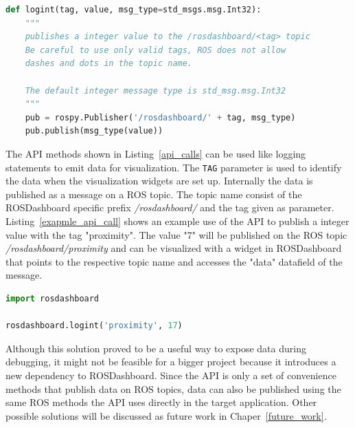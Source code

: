 \begin{lstlisting}[float,frame=single,caption={Implemented logint API method.},label=api_implementation,language=Python]
def logint(tag, value, msg_type=std_msgs.msg.Int32):
    """
    publishes a integer value to the /rosdashboard/<tag> topic
    Be careful to use only valid tags, ROS does not allow
    dashes and dots in the topic name.
    
    The default integer message type is std_msg.msg.Int32
    """
    pub = rospy.Publisher('/rosdashboard/' + tag, msg_type)
    pub.publish(msg_type(value))
\end{lstlisting}

The API methods shown in Listing~\ref{api_calls} can be used like logging statements to emit data for visualization. The \verb+TAG+ parameter is used to identify the data when the visualization widgets are set up. Internally the data is published as a message on a ROS topic. The topic name consist of the ROSDashboard specific prefix \emph{/rosdashboard/} and the tag given as parameter. Listing~\ref{exapmle_api_call} shows an example use of the API to publish a integer value with the tag "proximity". The value "7" will be published on the ROS topic \emph{/rosdashboard/proximity} and can be visualized with a widget in ROSDashboard that points to the respective topic name and accesses the "data" datafield of the message.

\begin{lstlisting}[float,frame=single,caption={Example API usage.},label=example_api_call,language=Python]
import rosdashboard

rosdashboard.logint('proximity', 17)
\end{lstlisting}

Although this solution proved to be a useful way to expose data during debugging, it might not be feasible for a bigger project because it introduces a new dependency to ROSDashboard. Since the API is only a set of convenience methods that publish data on ROS topics, data can also be published using the same ROS methods the API uses directly in the target application. Other possible solutions will be discussed as future work in Chaper~\ref{future_work}.
